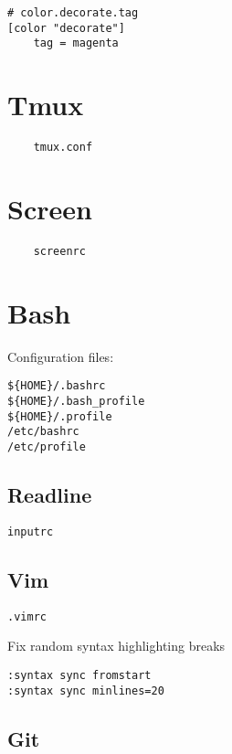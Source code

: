 \documentclass{article}
\begin{document}
\begin{verbatim}
# color.decorate.tag
[color "decorate"]
	tag = magenta
\end{verbatim}

\section{Tmux}

\begin{verbatim}
	tmux.conf
\end{verbatim}

\section{Screen}

\begin{verbatim}
	screenrc
\end{verbatim}



\section{Bash}

Configuration files:

\begin{verbatim}
${HOME}/.bashrc
${HOME}/.bash_profile
${HOME}/.profile
/etc/bashrc
/etc/profile
\end{verbatim}

\subsection{Readline}

\begin{verbatim}
inputrc
\end{verbatim}

\subsection{Vim}

\begin{verbatim}
.vimrc
\end{verbatim}

Fix random syntax highlighting breaks

\begin{verbatim}
:syntax sync fromstart
:syntax sync minlines=20
\end{verbatim}

\subsection{Git}
\end{document}
